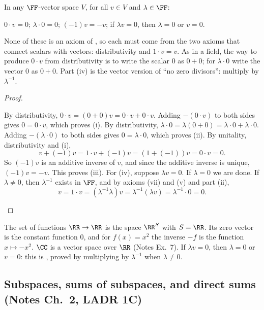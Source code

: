 \documentclass[10pt]{scrartcl}
\begin{document}
\begin{proposition*}
  In any $\FF$-vector space $V$, for all $v\in V$ and $\lambda\in\FF$:
  \begin{enumerate}[(i)]
    \ii $0\cdot v = 0$;
    \ii $\lambda\cdot 0 = 0$;
    \ii $(-1)v = -v$;
    \ii if $\lambda v = 0$, then $\lambda = 0$ or $v = 0$.
  \end{enumerate}
\end{proposition*}
\begin{ideabox}
  None of these is an axiom of , so each must come from the two axioms that connect scalars with vectors: distributivity and $1\cdot v=v$. As in a field, the way to produce $0\cdot v$ from distributivity is to write the scalar $0$ as $0+0$; for $\lambda\cdot 0$ write the vector $0$ as $0+0$. Part (iv) is the vector version of ``no zero divisors'': multiply by $\lambda^{-1}$.
\end{ideabox}
\begin{proof}
  \begin{steps}
    \ii By distributivity, $0\cdot v=(0+0)v=0\cdot v+0\cdot v$. Adding $-(0\cdot v)$ to both sides gives $0=0\cdot v$, which proves (i).
    \ii By distributivity, $\lambda\cdot 0=\lambda(0+0)=\lambda\cdot 0+\lambda\cdot 0$. Adding $-(\lambda\cdot 0)$ to both sides gives $0=\lambda\cdot 0$, which proves (ii).
    \ii By unitality, distributivity and (i),
    \[
      v+(-1)v=1\cdot v+(-1)v=(1+(-1))v=0\cdot v=0.
    \]
    So $(-1)v$ is an additive inverse of $v$, and since the additive inverse is unique, $(-1)v=-v$. This proves (iii).
    \ii For (iv), suppose $\lambda v=0$. If $\lambda=0$ we are done. If $\lambda\ne 0$, then $\lambda^{-1}$ exists in $\FF$, and by axioms (vii) and (v) and part (ii),
    \[
      v=1\cdot v=(\lambda^{-1}\lambda)v=\lambda^{-1}(\lambda v)=\lambda^{-1}\cdot 0=0.
    \]
  \end{steps}
\end{proof}

\revisit The set of functions $\RR\to\RR$ is the space $\RR^S$ with $S=\RR$. Its zero vector is the constant function $0$, and for $f(x)=x^2$ the inverse $-f$ is the function $x\mapsto -x^2$. $\CC$ is a vector space over $\RR$ (Notes Ex.~7). If $\lambda v=0$, then $\lambda=0$ or $v=0$: this is , proved by multiplying by $\lambda^{-1}$ when $\lambda\ne0$.

\subsection{Subspaces, sums of subspaces, and direct sums (Notes Ch.~2, LADR 1C)}
\end{document}
